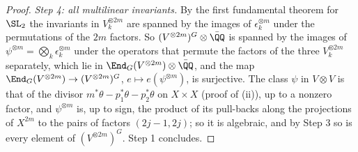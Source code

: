 \begin{proof}
\emph{Step 4: all multilinear invariants.} By the first fundamental theorem
for $\SL_{2}$ the invariants in $V_{k}^{\otimes2m}$ are spanned by the images
of $\epsilon_{k}^{\otimes m}$ under the permutations of the $2m$ factors. So
$(V^{\otimes2m})^{G}\otimes\bar{\QQ}$ is spanned by the images of
$\psi^{\otimes m}=\bigotimes_{k}\epsilon_{k}^{\otimes m}$ under the operators
that permute the factors of the three $V_{k}^{\otimes2m}$ separately, which
lie in $\End_{G}(V^{\otimes2m})\otimes\bar{\QQ}$, and the map
$\End_{G}(V^{\otimes2m})\to(V^{\otimes2m})^{G}$, $e\mapsto e(\psi^{\otimes m})$,
is surjective. The class $\psi$ in $V\otimes V$ is that of the divisor
$m^{*}\theta-p_{1}^{*}\theta-p_{2}^{*}\theta$ on $X\times X$ (proof of
(ii)), up to a nonzero factor, and $\psi^{\otimes m}$ is,
up to sign, the product of its pull-backs along the projections of $X^{2m}$
to the pairs of factors $(2j-1,2j)$; so it is algebraic, and by Step 3 so is
every element of $(V^{\otimes2m})^{G}$. Step 1 concludes.
\end{proof}

